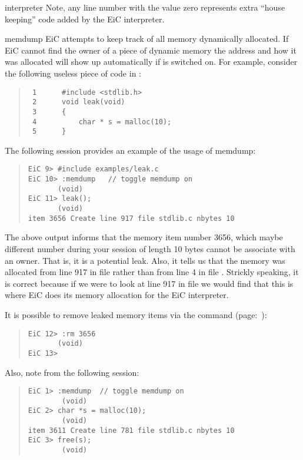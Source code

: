 \begin{Ventry} {interpreter}
Note, any line number with the value zero represents extra ``house
keeping'' code added by the EiC interpreter.

  


\item[memdump]
\label{item:memdump} 
EiC attempts to keep track of all memory dynamically allocated. 
If EiC cannot find the owner of a piece of dynamic memory the
address and how it was allocated will show up automatically if
 is switched on. For example, consider the following
useless piece of code in :

\begin{quote}
\begin{verbatim}
 1      #include <stdlib.h>
 2      void leak(void)
 3      {
 4          char * s = malloc(10);
 5      }
\end{verbatim}
\end{quote}

The following session provides an example of the usage of memdump:

\small
\begin{quote}
\begin{verbatim}
EiC 9> #include examples/leak.c
EiC 10> :memdump   // toggle memdump on
       (void)
EiC 11> leak();
       (void)
item 3656 Create line 917 file stdlib.c nbytes 10
\end{verbatim}
\end{quote}
\normalsize


The above output informs that the memory item number 3656, which
maybe different number during your session of length 10 bytes cannot be
associate with an owner. That is, it is a potential leak. Also, it
tells us that the memory was allocated from line 917 in file
 rather than from line 4 in file
. Strickly speaking, it is correct because if we
were to look at line 917 in file  we would find that this
is where EiC does its memory allocation for the EiC interpreter.

It is possible to remove leaked memory items via the
 command (page:~\pageref{item:rm}):
\small
\begin{quote}
\begin{verbatim}
EiC 12> :rm 3656
       (void)
EiC 13> 
\end{verbatim}
\end{quote}
\normalsize

Also, note from the following session:
\small
\begin{quote}
\begin{verbatim}
EiC 1> :memdump  // toggle memdump on
        (void)
EiC 2> char *s = malloc(10);
        (void)
item 3611 Create line 781 file stdlib.c nbytes 10
EiC 3> free(s);
        (void)
\end{verbatim}
\end{quote}
\normalsize


\end{Ventry}
